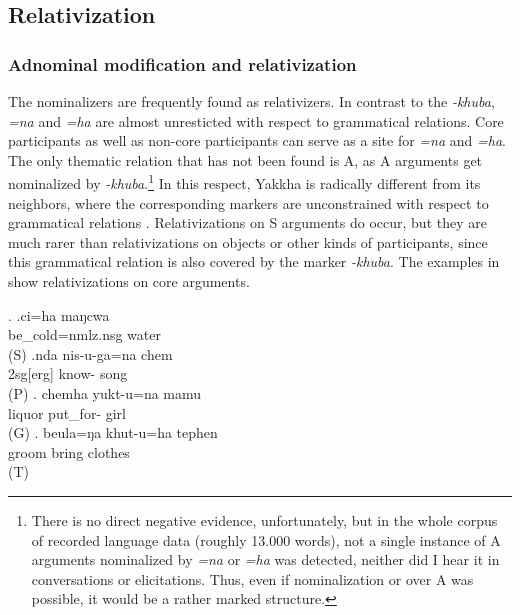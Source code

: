 \subsection{Relativization}\label{nmlz-uni-1}

\subsubsection{Adnominal modification and relativization}

The nominalizers are frequently found as relativizers. In contrast to the  \emph{-khuba}, \emph{=na} and \emph{=ha} are almost unresticted with respect to grammatical relations. Core participants as well as non-core participants can serve as a  site for  \emph{=na} and \emph{=ha}. The only thematic relation that has not been found is A, as A arguments get nominalized by \emph{-khuba}.\footnote{There is no direct negative evidence, unfortunately, but in the whole corpus of recorded language data (roughly 13.000 words), not a single instance of A arguments nominalized by \emph{=na} or \emph{=ha} was detected, neither did I hear it in conversations or elicitations. Thus, even if nominalization or  over A was possible, it would  be a rather marked structure.} In this respect, Yakkha is radically different from its neighbors, where the corresponding markers are unconstrained with respect to grammatical relations \citep{Ebert1997A-grammar, Bickel1999Nominalization}. Relativizations on S arguments do occur, but they are much rarer than relativizations on objects or other kinds of participants, since this grammatical relation is also covered by the marker \emph{-khuba}. The examples in  \Next show relativizations on core arguments.  

\ex. \ag.ci=ha maŋcwa\\
be\_cold{\sc =nmlz.nsg} water\\
 (S)
\bg.nda nis-u-ga=na chem\\
{\sc 2sg[erg]} know- song\\
 (P)
	\bg. chemha yukt-u=na mamu\\
liquor  put\_for- girl\\
 (G)
\bg. beula=ŋa khut-u=ha tephen\\ 
groom bring clothes\\
 (T) 

